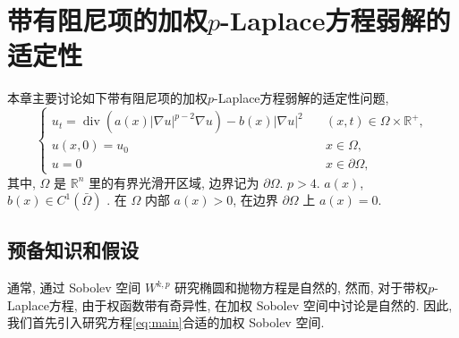 \documentclass[oneside,longtitle]{LZUthesis}
\numberwithin{equation}{chapter}
\newcommand*\abs[1]{\lvert#1\rvert}
\newcommand\R{\mathbb{R}}
\DeclareMathOperator{\Div}{div}
\begin{document}
\chapter{带有阻尼项的加权$p$-Laplace方程弱解的适定性}\label{ch:Existence_and_uniqueness_of_the_weak_solution}
本章主要讨论如下带有阻尼项的加权$p$-Laplace方程弱解的适定性问题,
\begin{equation}\label{eq:main}
	\begin{cases}
		u_t = \Div(a(x)\abs{\nabla u}^{p-2}\nabla u) - b(x)\abs{\nabla u}^2 \quad &(x, t) \in \Omega \times \R^+,\\
		u(x,0) = u_0 \quad &x \in \Omega,\\
		u = 0 \quad &x \in \partial\Omega,
	\end{cases}
\end{equation}
其中, $\Omega$ 是 $\R^{n}$ 里的有界光滑开区域, 边界记为 $\partial\Omega$. $p>4$.
$ a(x)$, $b(x) \in C^1(\bar{\Omega}) $
. 在 $\Omega$ 内部 $a(x) > 0$, 在边界 $\partial\Omega$ 上 $a(x) = 0$.
\section{预备知识和假设}\label{ch:preliminaries}
通常, 通过 Sobolev 空间 $W^{k, p}$ 研究椭圆和抛物方程是自然的,
然而, 对于带权$p$-Laplace方程, 由于权函数带有奇异性, 在加权 Sobolev 空间中讨论是自然的.
因此, 我们首先引入研究方程\eqref{eq:main}合适的加权 Sobolev 空间.
\end{document}
